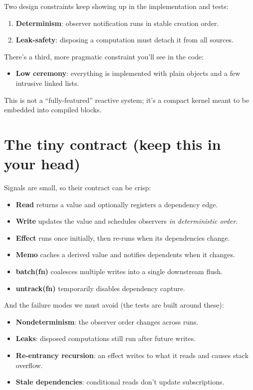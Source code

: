 Two design constraints keep showing up in the implementation and tests:

\begin{enumerate}
  \item \textbf{Determinism}: observer notification runs in stable creation order.
  \item \textbf{Leak-safety}: disposing a computation must detach it from all sources.
\end{enumerate}

There’s a third, more pragmatic constraint you’ll see in the code:

\begin{itemize}
  \item \textbf{Low ceremony}: everything is implemented with plain objects and a few intrusive linked lists.
\end{itemize}

This is not a ``fully-featured'' reactive system; it’s a compact kernel meant to be embedded into compiled blocks.

\section{The tiny contract (keep this in your head)}

Signals are small, so their contract can be crisp:

\begin{itemize}
  \item \textbf{Read} returns a value and optionally registers a dependency edge.
  \item \textbf{Write} updates the value and schedules observers \emph{in deterministic order}.
  \item \textbf{Effect} runs once initially, then re-runs when its dependencies change.
  \item \textbf{Memo} caches a derived value and notifies dependents when it changes.
  \item \textbf{batch(fn)} coalesces multiple writes into a single downstream flush.
  \item \textbf{untrack(fn)} temporarily disables dependency capture.
\end{itemize}

And the failure modes we must avoid (the tests are built around these):

\begin{itemize}
  \item \textbf{Nondeterminism}: the observer order changes across runs.
  \item \textbf{Leaks}: disposed computations still run after future writes.
  \item \textbf{Re-entrancy recursion}: an effect writes to what it reads and causes stack overflow.
  \item \textbf{Stale dependencies}: conditional reads don’t update subscriptions.
\end{itemize}

